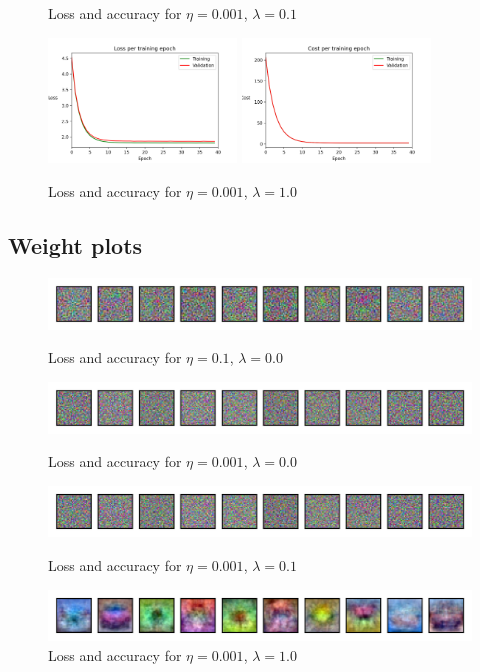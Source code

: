 \documentclass{article}
\begin{document}
\begin{figure}[h!]
		\caption{Loss and accuracy for $\eta=0.001$, $\lambda=0.1$}
		\vspace{0.2cm}
		\includegraphics[width=5cm]{../plots/loss_v4.png}
		\includegraphics[width=5cm]{../plots/cost_v4.png}
		\caption{Loss and accuracy for $\eta=0.001$, $\lambda=1.0$}
		\vspace{0.2cm}
	\end{figure}
	
\newpage
\subsection*{Weight plots}
	\begin{figure}[h!]
		\centering
		\includegraphics[width=12cm]{../plots/weights_v1.png}
		\caption{Loss and accuracy for $\eta=0.1$, $\lambda=0.0$}
		\vspace{0.2cm}
		\includegraphics[width=12cm]{../plots/weights_v2.png}
		\caption{Loss and accuracy for $\eta=0.001$, $\lambda=0.0$}
		\vspace{0.2cm}
		\includegraphics[width=12cm]{../plots/weights_v3.png}
		\caption{Loss and accuracy for $\eta=0.001$, $\lambda=0.1$}
		\vspace{0.2cm}
		\includegraphics[width=12cm]{../plots/weights_v4.png}
		\caption{Loss and accuracy for $\eta=0.001$, $\lambda=1.0$}
		\vspace{0.2cm}
	\end{figure}
\end{document}
